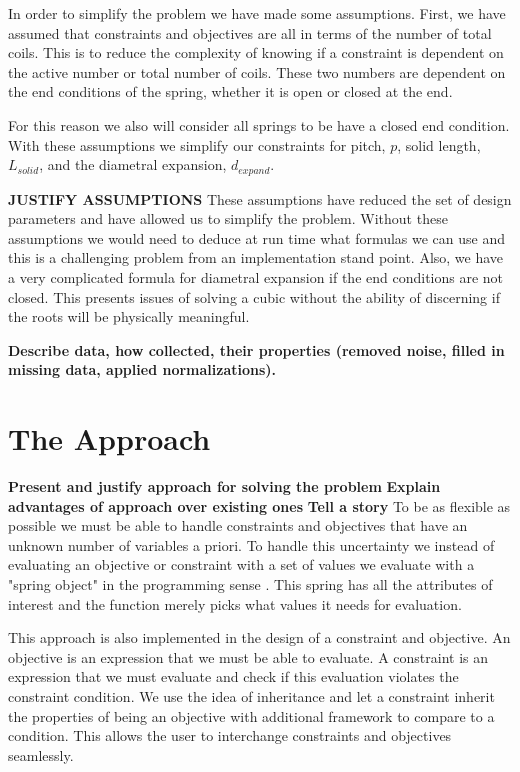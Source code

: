 \documentclass[10pt]{article}
\begin{document}
In order to simplify the problem we have made some assumptions. First, we have assumed that constraints and objectives are all in terms of the number of total coils. This is to reduce the complexity of knowing if a constraint is dependent on the active number or total number of coils. These two numbers are dependent on the end conditions of the spring, whether it is open or closed at the end. 

For this reason we also will consider all springs to be have a closed end condition. With these assumptions we simplify our constraints for pitch, $p$, solid length, $L_{solid}$, and the diametral expansion, $d_{expand}$.

\textbf{JUSTIFY ASSUMPTIONS}
These assumptions have reduced the set of design parameters and have allowed us to simplify the problem. Without these assumptions we would need to deduce at run time what formulas we can use and this is a challenging problem from an implementation stand point. Also, we have a very complicated formula for diametral expansion if the end conditions are not closed. This presents issues of solving a cubic without the ability of discerning if the roots will be physically meaningful. 


\textbf{Describe data, how collected, their properties (removed noise, filled in missing data, 
applied normalizations).}




\section{The Approach}
\label{sec:Approach}

\textbf{Present and justify approach for solving the problem}
\textbf{Explain advantages of approach over existing ones}
\textbf{Tell a story}
To be as flexible as possible we must be able to handle constraints and objectives that have an unknown number of  variables a priori. To handle this uncertainty we instead of evaluating an objective or constraint with a set of values we evaluate with a "spring object" in the programming sense \cite{OOP}. This spring has all the attributes of interest and the function merely picks what values it needs for evaluation. 

This approach is also implemented in the design of a constraint and objective. An objective is an expression that we must be able to evaluate. A constraint is an expression that we must evaluate and check if this evaluation violates the constraint condition. We use the idea of inheritance and let a constraint inherit the properties of being an objective with additional framework to compare to a condition. This allows the user to interchange constraints and objectives seamlessly.
\end{document}
